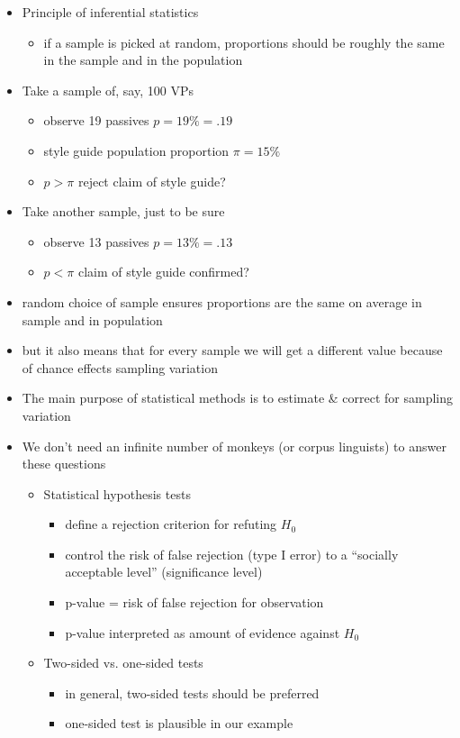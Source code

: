 \documentclass[a4paper,landscape,headrule,footrule,xetex]{foils}
\begin{document}
\begin{itemize}
\item Principle of inferential statistics
\begin{itemize}
\item if a sample is picked at random, proportions should be
roughly the same in the sample and in the population
\end{itemize}
\item Take a sample of, say, 100 VPs
\begin{itemize}
\item observe 19 passives \into $p = 19\% = .19$
\item style guide \into population proportion $\pi = 15\%$
\item $p > \pi$ \into reject claim of style guide?
\end{itemize}
\item Take another sample, just to be sure
\begin{itemize}
\item observe 13 passives \into $p = 13\% = .13$
\item $p < \pi$ \into claim of style guide confirmed?
\end{itemize}
\end{itemize}

\begin{itemize}
\item random choice of sample ensures proportions are the
  same on average in sample and in population
\item but it also means that for every sample we will get a
different value because of chance effects
\into sampling variation
\item The main purpose of statistical methods is to
estimate \& correct for sampling variation
\end{itemize}
\begin{itemize}
\item We don't need an infinite number of monkeys
(or corpus linguists) to answer these questions
\begin{itemize}
\item Statistical hypothesis tests
\begin{itemize}
\item define a rejection criterion for refuting $H_0$
\item control the risk of false rejection (type I error) to a
“socially acceptable level” (significance level)
\item p-value = risk of false rejection for observation
\item p-value interpreted as amount of evidence against $H_0$
\end{itemize}
\item Two-sided vs. one-sided tests
\begin{itemize}
\item in general, two-sided tests should be preferred
\item one-sided test is plausible in our example
\end{itemize}
\end{itemize}
\end{itemize}
\end{document}
